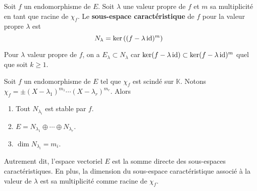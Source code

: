     \begin{defi}{}{}
        Soit $f$ un endomorphisme de $E$. Soit $\lambda$ une valeur propre de $f$ et $m$ sa multiplicité en tant que racine de $\chi_f$. Le \textbf{sous-espace caractéristique} de $f$ pour la valeur propre $\lambda$ est 
        \[ N_{\lambda} = \ker\left((f - \lambda \operatorname{id})^m\right) \]     
    \end{defi}

    Pour $\lambda$ valeur propre de $f$, on a $E_{\lambda} \subset N_{\lambda}$ car $\ker(f - \lambda \operatorname{id}) \subset \ker(f - \lambda \operatorname{id})^m$ quel que soit $k \geq 1$.

    \begin{theo}{}{}
        Soit $f$ un endomorphisme de $E$ tel que $\chi_f$ est scindé sur $\mathbb{K}$. Notons $\chi_f = \pm (X - \lambda_1)^{m_1} \cdots (X - \lambda_r)^{m_r}$. Alors 
        \begin{enumerate}
            \item Tout $N_{\lambda_i}$ est stable par $f$.
            \item $E = N_{\lambda_1} \oplus \cdots \oplus N_{\lambda_r}$.
            \item $\dim N_{\lambda_i} = m_i$.
        \end{enumerate}
    \end{theo}

    Autrement dit, l’espace vectoriel $E$ est la somme directe des sous-espaces caractéristiques. En plus, la dimension du sous-espace caractéristique associé à la valeur de $\lambda$ est sa multiplicité comme racine de $\chi_f$.

